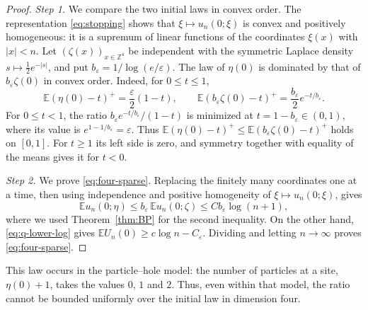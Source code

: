 \documentclass[11pt]{amsart}
\theoremstyle{plain}
\theoremstyle{definition}
\newcommand{\Z}{\mathbb{Z}}
\newcommand{\E}{\mathbb{E}}
\newcommand{\eps}{\varepsilon}
\begin{document}
\begin{proof}
	\smallskip
	\noindent\emph{Step 1.} We compare the two initial laws in convex order.
	The representation \eqref{eq:stopping} shows that
	$\xi\mapsto u_n(0;\xi)$ is convex and positively homogeneous: it is a
	supremum of linear functions of the coordinates $\xi(x)$ with $|x|<n$.
	Let $(\zeta(x))_{x\in\Z^4}$ be independent with the symmetric Laplace
	density $s\mapsto\tfrac12e^{-|s|}$, and put
	$b_\eps=1/\log(e/\eps)$. The law of $\eta(0)$ is dominated by that of $b_\eps\zeta(0)$ in convex
	order.
	Indeed, for $0\leq t\leq1$,
	\[
		\E(\eta(0)-t)^+=\frac\eps2(1-t),
		\qquad
		\E(b_\eps\zeta(0)-t)^+
		=\frac{b_\eps}{2}e^{-t/b_\eps}.
	\]
	For $0\leq t<1$, the ratio
	$b_\eps e^{-t/b_\eps}/(1-t)$ is minimized at
	$t=1-b_\eps\in(0,1)$, where its value is
	$e^{1-1/b_\eps}=\eps$. Thus
	$\E(\eta(0)-t)^+\leq\E(b_\eps\zeta(0)-t)^+$ holds on
	$[0,1]$. For $t\geq1$ its left side is zero, and symmetry together with
	equality of the means gives it for $t<0$.

	\smallskip
	\noindent\emph{Step 2.} We prove \eqref{eq:four-sparse}.
	Replacing the finitely many coordinates one at a time, then using
	independence and positive homogeneity of
    $\xi\mapsto u_n(0;\xi)$, gives
	\[
		\E u_n(0;\eta)
		\leq b_\eps\,\E u_n(0;\zeta)
		\leq Cb_\eps\log(n+1),
	\]
	where we used Theorem~\ref{thm:BP} for the second inequality. On the other hand,
	\eqref{eq:q-lower-log} gives
	$\E U_n(0)\geq c\log n-C_\eps$. Dividing and letting $n\to\infty$ proves
	\eqref{eq:four-sparse}.
\end{proof}

This law occurs in the particle--hole model: the number of particles at a site,
$\eta(0)+1$, takes the values $0$, $1$ and $2$. Thus, even within that model,
the ratio cannot be bounded uniformly over the initial law in dimension four.
\end{document}
